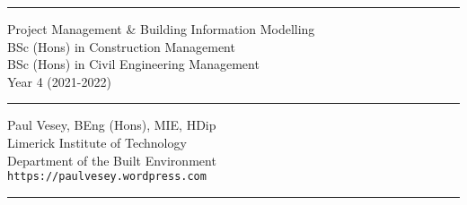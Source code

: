 
\thispagestyle{empty} %


\hrule

\vspace*{0.7cm} %


\begin{flushright}
\Huge Project Management \& Building Information Modelling \\
\vspace*{0.7cm}
\Large BSc (Hons) in Construction Management\\
BSc (Hons) in Civil Engineering Management\\
Year 4 (2021-2022)
\end{flushright}

\vspace*{0.7cm} %
	
\normalsize

\hrule


\vfill %


{\centering \large 
\hfill Paul Vesey, \scriptsize BEng (Hons), MIE, HDip\normalsize \\
\hfill Limerick Institute of Technology \\
\hfill Department of the Built Environment \\
\hfill \texttt{https://paulvesey.wordpress.com} \\
\vspace*{0.7cm} 
\hrule} %


\clearpage %
